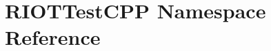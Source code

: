 \hypertarget{namespaceRIOTTestCPP}{}\section{R\+I\+O\+T\+Test\+C\+PP Namespace Reference}
\label{namespaceRIOTTestCPP}
